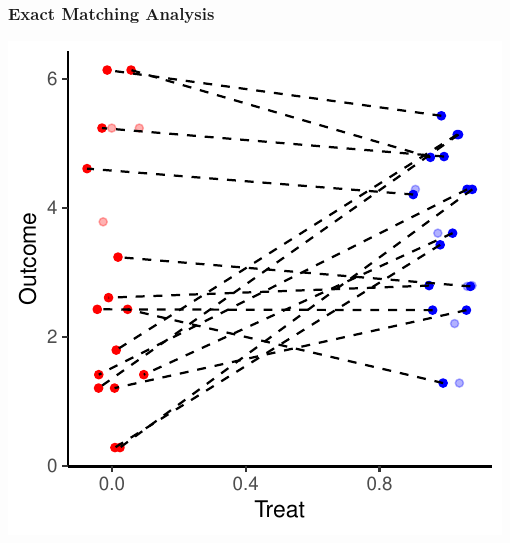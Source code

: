 \documentclass[xcolor=x11names,compress]{beamer}\usepackage[]{graphicx}\usepackage[]{color}
\makeatletter
\def\maxwidth{ %
  \ifdim\Gin@nat@width>\linewidth
    \linewidth
  \else
    \Gin@nat@width
  \fi
}
\newenvironment{knitrout}{}{} %
\renewcommand{\(}{\begin{columns}}
\renewcommand{\)}{\end{columns}}
\newcommand{\<}[1]{\begin{column}{#1}}
\renewcommand{\>}{\end{column}}
\makeatother
\begin{document}
\begin{frame}
\frametitle{Exact Matching Analysis}
\begin{center}
\begin{knitrout}
\color{fgcolor}
\includegraphics[width=\maxwidth]{figure/exact_matching_analysis-1} 

\end{knitrout}
\end{center}
\end{frame}
\end{document}
